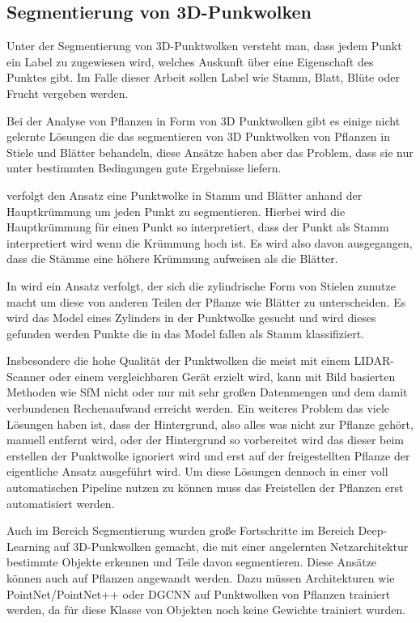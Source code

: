 \documentclass[12pt,titlepage, twoside]{article}
\begin{document}
\subsection{Segmentierung von 3D-Punkwolken}
\label{sec:stand:segmentierung}

Unter der Segmentierung von 3D-Punktwolken versteht man, dass jedem Punkt ein Label zu zugewiesen wird, welches Auskunft über eine Eigenschaft des Punktes gibt. Im Falle dieser Arbeit sollen Label wie Stamm, Blatt, Blüte oder Frucht vergeben werden.

Bei der Analyse von Pflanzen in Form von 3D Punktwolken gibt es einige nicht gelernte Lösungen \cite{ThreeBasics} \cite{ModelBased} die das segmentieren von 3D Punktwolken von Pflanzen in Stiele und Blätter behandeln, 
diese Ansätze haben aber das Problem, dass sie nur unter bestimmten Bedingungen gute Ergebnisse liefern.

\cite{ThreeBasics} verfolgt den Ansatz eine Punktwolke in Stamm und Blätter anhand der Hauptkrümmung um jeden Punkt zu segmentieren. 
Hierbei wird die Hauptkrümmung für einen Punkt so interpretiert, dass der Punkt als Stamm interpretiert wird wenn die Krümmung hoch ist. 
Es wird also davon ausgegangen, dass die Stämme eine höhere Krümmung aufweisen als die Blätter. 

In \cite{ModelBased}  wird ein Ansatz verfolgt, der sich die zylindrische Form von Stielen zunutze macht um diese von anderen Teilen der Pflanze wie Blätter zu unterscheiden. 
Es wird das Model eines Zylinders in der Punktwolke gesucht und wird dieses gefunden werden Punkte die in das Model fallen als Stamm klassifiziert.

Insbesondere die hohe Qualität der Punktwolken die meist mit einem LIDAR-Scanner oder einem vergleichbaren Gerät erzielt wird, 
kann mit Bild basierten Methoden wie SfM nicht oder nur mit sehr großen Datenmengen und dem damit verbundenen Rechenaufwand erreicht werden. 
Ein weiteres Problem das viele Lösungen haben ist, dass der Hintergrund, also alles was nicht zur Pflanze gehört, manuell entfernt wird, 
oder der Hintergrund so vorbereitet wird das dieser beim erstellen der Punktwolke ignoriert wird und erst auf der freigestellten Pflanze der eigentliche Ansatz ausgeführt wird. 
Um diese Lösungen dennoch in einer voll automatischen Pipeline nutzen zu können muss das Freistellen der Pflanzen erst automatisiert werden.

Auch im Bereich Segmentierung wurden große Fortschritte im Bereich Deep-Learning auf 3D-Punkwolken gemacht, die mit einer angelernten Netzarchitektur bestimmte Objekte erkennen und Teile davon segmentieren. 
Diese Ansätze können auch auf Pflanzen angewandt werden. Dazu müssen Architekturen wie PointNet\cite{qi2017pointnet}/PointNet++\cite{qi2017pointnet++} oder DGCNN \cite{dgcnn} auf Punktwolken von Pflanzen trainiert werden, 
da für diese Klasse von Objekten noch keine Gewichte trainiert wurden.
\end{document}
